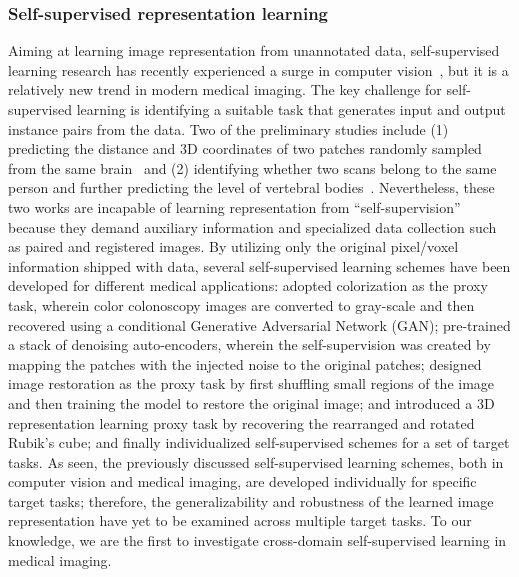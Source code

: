 \subsubsection{Self-supervised representation learning}

Aiming at learning image representation from unannotated data, self-supervised learning research has recently experienced a surge in computer vision~\citep{caron2018deep,chen2019rotation,doersch2015unsupervised,goyal2019scaling,jing2020self,mahendran2018cross,mundhenk2018improvements,noroozi2018boosting,noroozi2016unsupervised,pathak2016context,sayed2018cross,zhang2016colorful,zhang2017split}, but it is a relatively new trend in modern medical imaging. The key challenge for self-supervised learning is identifying a suitable task that generates input and output instance pairs from the data. Two of the preliminary studies include (1) predicting the distance and 3D coordinates of two patches randomly sampled from the same brain~\citep{spitzer2018improving} and (2) identifying whether two scans belong to the same person and further predicting the level of vertebral bodies~\citep{jamaludin2017self}. Nevertheless, these two works are incapable of learning representation from ``self-supervision'' because they demand auxiliary information and specialized data collection such as paired and registered images. By utilizing only the original pixel/voxel information shipped with data, several self-supervised learning schemes have been developed for different medical applications: \citet{ross2018exploiting} adopted colorization as the proxy task, wherein color colonoscopy images are converted to gray-scale and then recovered using a conditional Generative Adversarial Network (GAN); \citet{alex2017semisupervised} pre-trained a stack of denoising auto-encoders, wherein the self-supervision was created by mapping the patches with the injected noise to the original patches; \citet{chen2019self} designed image restoration as the proxy task by first shuffling small regions of the image and then training the model to restore the original image; \citet{zhuang2019self} and \citet{zhu2020rubik} introduced a 3D representation learning proxy task by recovering the rearranged and rotated Rubik's cube; and finally \citet{tajbakhsh2019surrogate} individualized self-supervised schemes for a set of target tasks. As seen, the previously discussed self-supervised learning schemes, both in computer vision and medical imaging, are developed individually for specific target tasks; therefore, the generalizability and robustness of the learned image representation have yet to be examined across multiple target tasks. To our knowledge, we are the first to investigate cross-domain self-supervised learning in medical imaging. 